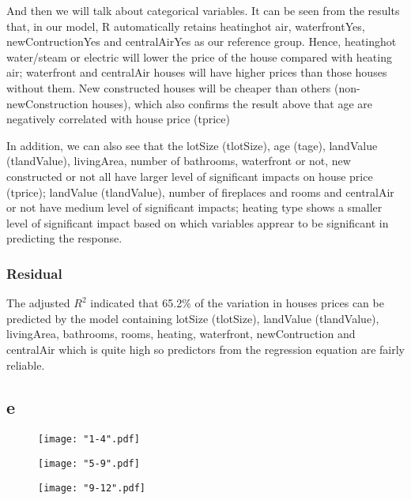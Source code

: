 \documentclass[12pt]{article}
\begin{document}
\bigskip{}
\noindent
And then we will talk about categorical variables. It can be seen from the results that, in our model, R automatically retains heatinghot air, waterfrontYes, newContructionYes and centralAirYes as our reference group. Hence, heatinghot water/steam or electric will lower the price of the house compared with heating air; waterfront and centralAir houses will have higher prices than those houses without them. New constructed houses will be cheaper than others (non-newConstruction houses), which also confirms the result above that age are negatively correlated with house price (tprice)

\bigskip{}
\noindent
In addition, we can also see that the lotSize (tlotSize), age (tage), landValue (tlandValue), livingArea, number of bathrooms, waterfront or not, new constructed or not all have larger level of significant impacts on house price (tprice); landValue (tlandValue), number of fireplaces and rooms and centralAir or not have medium level of significant impacts; heating type shows a smaller level of significant impact based on which variables apprear to be significant in predicting the response.

\subsubsection{Residual}
The adjusted $R^2$ indicated that 65.2\% of the variation in houses prices can be predicted by the model containing lotSize (tlotSize), landValue (tlandValue), livingArea, bathrooms, rooms, heating, waterfront, newContruction and centralAir which is quite high so predictors from the regression equation are fairly reliable. 



\subsection{e}

\begin{figure}[!htb]
	\centering
	\texttt{[image: "1-4".pdf]} 
	\caption{}
\end{figure}

\begin{figure}[!htb]
	\centering
	\texttt{[image: "5-9".pdf]} 
	\caption{}
\end{figure}

\begin{figure}[!htb]
	\centering
	\texttt{[image: "9-12".pdf]} 
	\caption{}
\end{figure}
\end{document}
